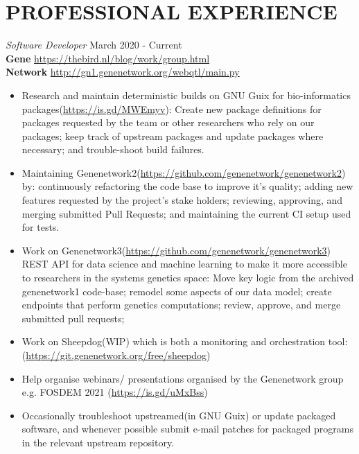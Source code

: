\documentclass[margin, line]{res} %
\begin{document}


\section{PROFESSIONAL EXPERIENCE}

{\sl Software Developer} \hfill March 2020 - Current \\
\textbf{Gene} \hfill \url{https://thebird.nl/blog/work/group.html} \\
\textbf{Network} \hfill \url{http://gn1.genenetwork.org/webqtl/main.py}

\begin{itemize} \itemsep -2pt
\item Research and maintain deterministic builds on GNU Guix for
  bio-informatics packages(\url{https://is.gd/MWEmyv}): Create new
  package definitions for packages requested by the team or other
  researchers who rely on our packages; keep track of upstream
  packages and update packages where necessary; and trouble-shoot
  build failures.
\item Maintaining
  Genenetwork2(\url{https://github.com/genenetwork/genenetwork2}) by:
  continuously refactoring the code base to improve it's quality;
  adding new features requested by the project's stake holders;
  reviewing, approving, and merging submitted Pull Requests; and
  maintaining the current CI setup used for tests.
\item Work on
  Genenetwork3(\url{https://github.com/genenetwork/genenetwork3}) REST
  API for data science and machine learning to make it more accessible
  to researchers in the systems genetics space: Move key logic from
  the archived genenetwork1 code-base; remodel some aspects of our data
  model; create endpoints that perform genetics computations; review,
  approve, and merge submitted pull requests;
\item Work on Sheepdog(WIP) which is both a monitoring and
  orchestration tool:
  (\url{https://git.genenetwork.org/free/sheepdog})
\item Help organise webinars/ presentations organised by the
  Genenetwork group e.g. FOSDEM 2021 (\url{https://is.gd/uMxBss})
\item Occasionally troubleshoot upstreamed(in GNU Guix) or update
  packaged software, and whenever possible submit e-mail patches for
  packaged programs in the relevant upstream repository.
\end{itemize}
\end{document}
